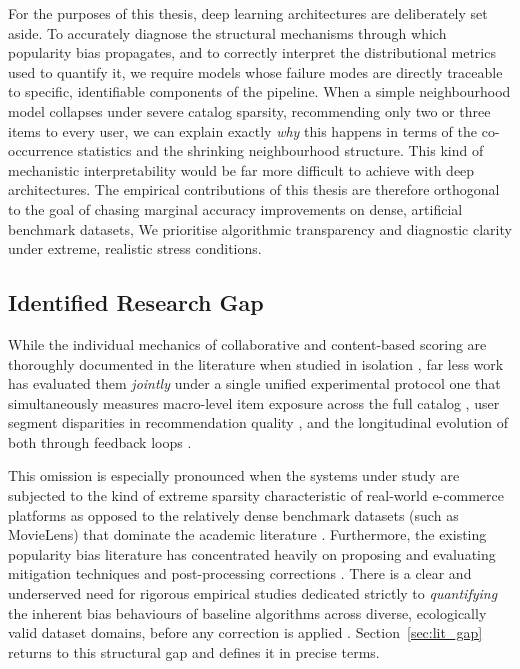 \documentclass[11pt,a4paper]{report}
\begin{document}
For the purposes of this thesis, deep learning architectures are deliberately set aside. To accurately diagnose the structural mechanisms through which popularity bias propagates, and to correctly interpret the distributional metrics used to quantify it, we require models whose failure modes are directly traceable to specific, identifiable components of the pipeline. When a simple neighbourhood model collapses under severe catalog sparsity, recommending only two or three items to every user, we can explain exactly \emph{why} this happens in terms of the co-occurrence statistics and the shrinking neighbourhood structure. This kind of mechanistic interpretability would be far more difficult to achieve with deep architectures. The empirical contributions of this thesis are therefore orthogonal to the goal of chasing marginal accuracy improvements on dense, artificial benchmark datasets, We prioritise algorithmic transparency and diagnostic clarity under extreme, realistic stress conditions.

\subsection{Identified Research Gap}
\label{sec:lit_paradigm_gap}

While the individual mechanics of collaborative and content-based scoring are thoroughly documented in the literature when studied in isolation \citep{ricci2015recommender}, far less work has evaluated them \emph{jointly} under a single unified experimental protocol one that simultaneously measures macro-level item exposure across the full catalog \citep{fleder2009blockbuster}, user segment disparities in recommendation quality \citep{abdollahpouri2021usercentered}, and the longitudinal evolution of both through feedback loops \citep{mansoury2020feedback}.

This omission is especially pronounced when the systems under study are subjected to the kind of extreme sparsity characteristic of real-world e-commerce platforms as opposed to the relatively dense benchmark datasets (such as MovieLens) that dominate the academic literature \citep{klimashevskaia2024survey, harper2015movielens, brynjolfsson2006niches}. Furthermore, the existing popularity bias literature has concentrated heavily on proposing and evaluating mitigation techniques and post-processing corrections \citep{abdollahpouri2019managing, boratto2021connecting}. There is a clear and underserved need for rigorous empirical studies dedicated strictly to \emph{quantifying} the inherent bias behaviours of baseline algorithms across diverse, ecologically valid dataset domains, before any correction is applied \citep{klimashevskaia2024survey}. Section~\ref{sec:lit_gap} returns to this structural gap and defines it in precise terms.
\end{document}
